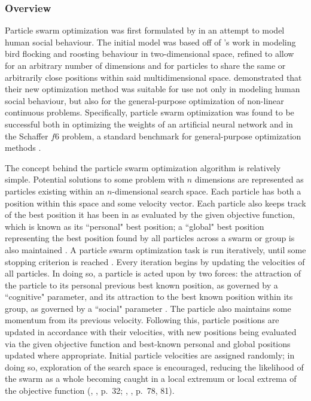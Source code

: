 \documentclass[12pt,a4paper]{article}
\newcommand{\citetwo}[4]{(\citeauthor{#1}, \citeyear{#1}, p.~#2; \citeauthor{#3}, \citeyear{#3}, p.~#4)}
\begin{document}
\subsubsection{Overview}
Particle swarm optimization was first formulated by \cite{kennedy1995} in an attempt to model human social behaviour. The initial model was based off of \cite{heppner1990}'s work in modeling bird flocking and roosting behaviour in two-dimensional space, refined to allow for an arbitrary number of dimensions and for particles to share the same or arbitrarily close positions within said multidimensional space. \citeauthor{kennedy1995} demonstrated that their new optimization method was suitable for use not only in modeling human social behaviour, but also for the general-purpose optimization of non-linear continuous problems. Specifically, particle swarm optimization was found to be successful both in optimizing the weights of an artificial neural network and in the Schaffer $f6$ problem, a standard benchmark for general-purpose optimization methods \citep{davis1991}.

The concept behind the particle swarm optimization algorithm is relatively simple. Potential solutions to some problem with $n$ dimensions are represented as particles existing within an $n$-dimensional search space. Each particle has both a position within this space and some velocity vector. Each particle also keeps track of the best position it has been in as evaluated by the given objective function, which is known as its ``personal" best position; a ``global" best position representing the best position found by all particles across a swarm or group is also maintained \citep{chong2013}. A particle swarm optimization task is run iteratively, until some stopping criterion is reached \citep[p.~80]{solnon2010}. Every iteration begins by updating the velocities of all particles. In doing so, a particle is acted upon by two forces: the attraction of the particle to its personal previous best known position, as governed by a ``cognitive" parameter, and its attraction to the best known position within its group, as governed by a ``social" parameter \citep{chong2013}. The particle also maintains some momentum from its previous velocity. Following this, particle positions are updated in accordance with their velocities, with new positions being evaluated via the given objective function and best-known personal and global positions updated where appropriate. Initial particle velocities are assigned randomly; in doing so, exploration of the search space is encouraged, reducing the likelihood of the swarm as a whole becoming caught in a local extremum or local extrema of the objective function \citetwo{yang2014}{32}{solnon2010}{78, 81}. 
\end{document}
